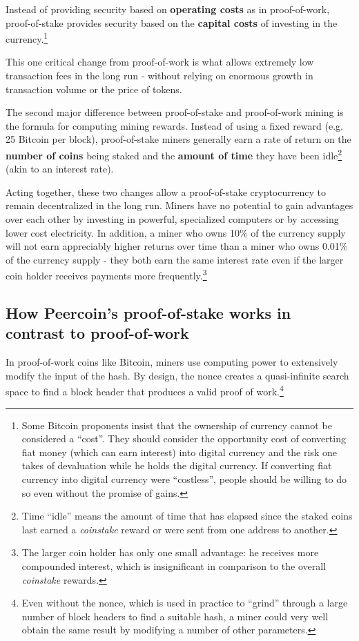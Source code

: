 \documentclass[a4paper,11pt]{article}
\begin{document}
Instead of providing security based on \textbf{operating costs} as in proof-of-work, proof-of-stake provides security based on the \textbf{capital costs} of investing in the currency.\footnote{Some Bitcoin proponents insist that the ownership of currency cannot be considered a ``cost''. They should consider the opportunity cost of converting fiat money (which can earn interest) into digital currency and the risk one takes of devaluation while he holds the digital currency. If converting fiat currency into digital currency were ``costless'', people should be willing to do so even without the promise of gains.}

This one critical change from proof-of-work is what allows extremely low transaction fees in the long run - without relying on enormous growth in transaction volume or the price of tokens. 
 
The second major difference between proof-of-stake and proof-of-work mining is the formula for computing mining rewards. Instead of using a fixed reward (e.g. 25 Bitcoin per block), proof-of-stake miners generally earn a rate of return on the \textbf{number of coins} being staked and the \textbf{amount of time} they have been idle\footnote{Time ``idle'' means the amount of time that has elapsed since the staked coins last earned a \textit{coinstake} reward or were sent from one address to another.} (akin to an interest rate). 

Acting together, these two changes allow a proof-of-stake cryptocurrency to remain decentralized in the long run. Miners have no potential to gain advantages over each other by investing in powerful, specialized computers or by accessing lower cost electricity. In addition, a miner who owns 10\% of the currency supply will not earn appreciably higher returns over time than a miner who owns 0.01\% of the currency supply - they both earn the same interest rate even if the larger coin holder receives payments more frequently.\footnote{The larger coin holder has only one small advantage: he receives more compounded interest, which is insignificant in comparison to the overall \textit{coinstake} rewards.}

\subsection{How Peercoin's proof-of-stake works in contrast to proof-of-work}
\label{31}

In proof-of-work coins like Bitcoin, miners use computing power to extensively modify the input of the hash. By design, the nonce creates a quasi-infinite search space to find a block header that produces a valid proof of work.\footnote{Even without the nonce, which is used in practice to ``grind'' through a large number of block headers to find a suitable hash, a miner could very well obtain the same result by modifying a number of other parameters.}
\end{document}
